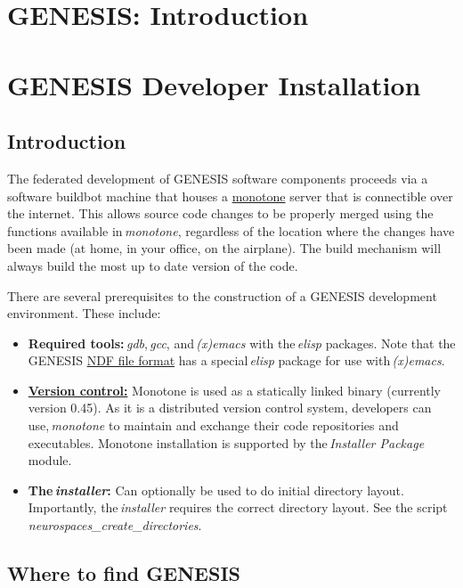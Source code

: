 \documentclass[12pt]{article}
\begin{document}
\section*{GENESIS: Introduction}

\section*{GENESIS Developer Installation}

\subsection*{Introduction}

The federated development of GENESIS software components proceeds via a software buildbot machine that houses a \href{http://monotone.ca/}{monotone} server that is connectible over the internet. This allows source code changes to be properly merged using the functions available in\,{\it monotone}, regardless of the location where the changes have been made (at home, in your office, on the airplane). The build mechanism will always build the most up to date version of the code.

There are several prerequisites to the construction of a GENESIS development environment. These include:

\begin{itemize}

\item {\bf Required tools:}\,{\it gdb},\,{\it gcc}, and\,{\it (x)emacs} with the\,{\it elisp} packages. Note that the GENESIS \href{../ndf-file-format/ndf-file-format.tex}{NDF file format} has a special\,{\it elisp} package for use with\,{\it (x)emacs}.
\item \href{../version-control/version-control.tex}{{\bf Version control:}} Monotone is used as a statically linked binary (currently version 0.45). As it is a distributed version control system, developers can use,\,{\it monotone} to maintain and exchange their code repositories and executables. Monotone installation is supported by the\,{\it Installer Package} module. 
\item {\bf  The\,{\it installer}:} Can optionally be used to do initial directory layout. Importantly, the\,{\it installer} requires the correct directory layout. See the script {\it neurospaces\_create\_directories}.

\end{itemize}

\subsection*{Where to find GENESIS}
\end{document}
